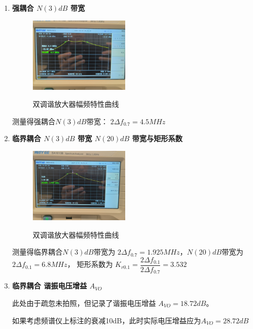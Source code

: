 \documentclass[UTF8]{ctexart}
\begin{document}
\begin{enumerate}[(1)]
    \item \noindent \textbf{强耦合 $N(3)dB$ 带宽}
    
    \begin{figure}[H]
        \centering
        \includegraphics[width=0.45\textwidth]{pics/3.3.1.png}
        ~\\
        \caption{双调谐放大器幅频特性曲线}\label{fig:3.3.1}
    \end{figure}

    \vspace{-2em}
    测量得强耦合$N(3)dB$带宽：
    $2\Delta f_{0.7}=4.5MHz$
    
    \item \noindent \textbf{临界耦合 $N(3)dB$ 带宽 $N(20)dB$ 带宽与矩形系数}

    \begin{figure}[H]
        \centering
        \includegraphics[width=0.45\textwidth]{pics/3.3.2.png}
        ~\\
        \caption{双调谐放大器幅频特性曲线}\label{fig:3.3.2}
    \end{figure}

    \vspace{-2em}
    测量得临界耦合$N(3)dB$带宽为
    $2\Delta f_{0.7}=1.925MHz$，$N(20)dB$带宽为
    $2\Delta f_{0.1}=6.8MHz$，
    矩形系数为
    $K_{r0.1}=\dfrac{2\Delta f_{0.1}}{2\Delta f_{0.7}}=3.532$
    
    \item \noindent \textbf{临界耦合 谐振电压增益 $A_{VO}$}

    此处由于疏忽未拍照，但记录了谐振电压增益 $A_{VO}=18.72dB$。

    如果考虑频谱仪上标注的衰减10dB，此时实际电压增益应为$A_{VO}=28.72dB$  
    
\end{enumerate}
\end{document}
